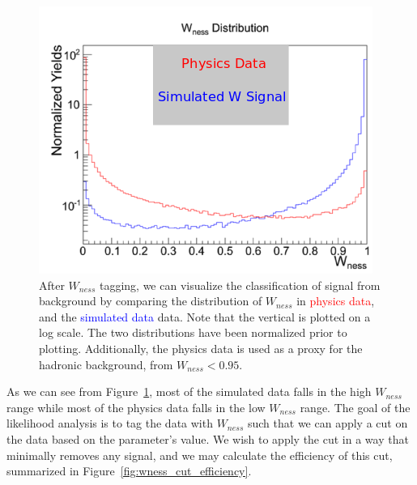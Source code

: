 \begin{figure}
  \centering
  \includegraphics[width=0.7\linewidth]{./figures/wness_sig_bak.png}
  \caption{
    After $W_{ness}$ tagging, we can visualize the classification of signal from
    background by comparing the distribution of $W_{ness}$ in
    \textcolor{red}{physics data}, and the \textcolor{blue}{simulated data}
    data. Note that the vertical is plotted on a log scale. The two
    distributions have been normalized prior to plotting. Additionally, the
    physics data is used as a proxy for the hadronic background, from $W_{ness}
    < 0.95$.
  }
  \label{fig:wness_distribution}
\end{figure}

As we can see from Figure~\ref{fig:wness_distribution}, most of the simulated
data falls in the high $W_{ness}$ range while most of the physics data falls in
the low $W_{ness}$ range. The goal of the likelihood analysis is to tag the data
with $W_{ness}$ such that we can apply a cut on the data based on the
parameter's value. We wish to apply the cut in a way that minimally removes any
signal, and we may calculate the efficiency of this cut, summarized in
Figure~\ref{fig:wness_cut_efficiency}.


